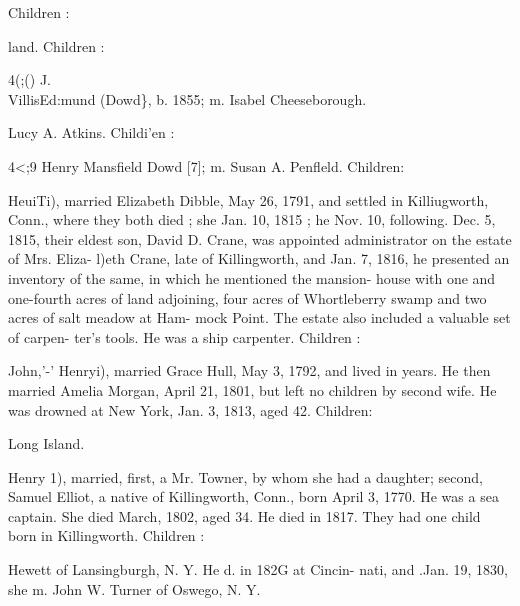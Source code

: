 \documentclass[oneside]{book}
\begin{document}
Children : 








land. Children : 





4(;() J. \\VillisEd:mund (Dowd\}, b. 1855; m. Isabel Cheeseborough. 






Lucy A. Atkins. Childi'en : 



4<;9 Henry Mansfield Dowd [7]; m. Susan A. Penfleld. Children: 











HeuiTi), married Elizabeth Dibble, May 26, 1791, and settled 
in Killiugworth, Conn., where they both died ; she Jan. 10, 1815 ; 
he Nov. 10, following. Dec. 5, 1815, their eldest son, David D. 
Crane, was appointed administrator on the estate of Mrs. Eliza- 
l)eth Crane, late of Killingworth, and Jan. 7, 1816, he presented 
an inventory of the same, in which he mentioned the mansion- 
house with one and one-fourth acres of land adjoining, four acres 
of Whortleberry swamp and two acres of salt meadow at Ham- 
mock Point. The estate also included a valuable set of carpen- 
ter's tools. He was a ship carpenter. Children : 









John,'-' Henryi), married Grace Hull, May 3, 1792, and lived in 
years. He then married Amelia Morgan, April 21, 1801, but 
left no children by second wife. He was drowned at New York, 
Jan. 3, 1813, aged 42. Children: 


Long Island. 

Henry 1), married, first, a Mr. Towner, by whom she had a 
daughter; second, Samuel Elliot, a native of Killingworth, Conn., 
born April 3, 1770. He was a sea captain. She died March, 
1802, aged 34. He died in 1817. They had one child born in 
Killingworth. Children : 


Hewett of Lansingburgh, N. Y. He d. in 182G at Cincin- 
nati, and .Jan. 19, 1830, she m. John W. Turner of Oswego, 
N. Y. 
\end{document}
